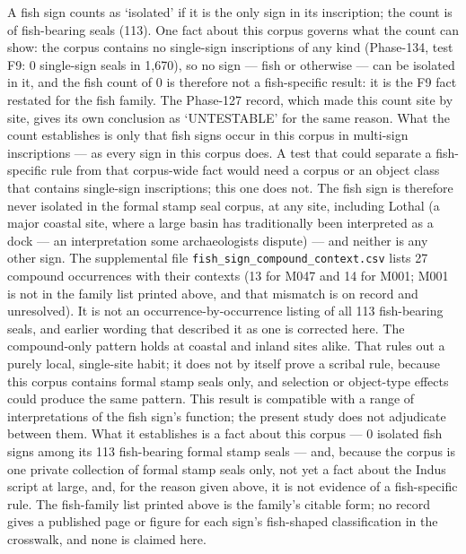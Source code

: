 \documentclass[
]{article}
\newcounter{none} %
\begin{document}
A fish sign counts as `isolated' if it is the only sign in its inscription; the count is of fish-bearing seals (113). One fact about this corpus governs what the count can show: the corpus contains no single-sign inscriptions of any kind (Phase-134, test F9: 0 single-sign seals in 1,670), so no sign --- fish or otherwise --- can be isolated in it, and the fish count of 0 is therefore not a fish-specific result: it is the F9 fact restated for the fish family. The Phase-127 record, which made this count site by site, gives its own conclusion as `UNTESTABLE' for the same reason. What the count establishes is only that fish signs occur in this corpus in multi-sign inscriptions --- as every sign in this corpus does. A test that could separate a fish-specific rule from that corpus-wide fact would need a corpus or an object class that contains single-sign inscriptions; this one does not. The fish sign is therefore never isolated in the formal stamp seal corpus, at any site, including Lothal (a major coastal site, where a large basin has traditionally been interpreted as a dock --- an interpretation some archaeologists dispute) --- and neither is any other sign. The supplemental file \texttt{fish\_sign\_compound\_context.csv} lists 27 compound occurrences with their contexts (13 for M047 and 14 for M001; M001 is not in the family list printed above, and that mismatch is on record and unresolved). It is not an occurrence-by-occurrence listing of all 113 fish-bearing seals, and earlier wording that described it as one is corrected here. The compound-only pattern holds at coastal and inland sites alike. That rules out a purely local, single-site habit; it does not by itself prove a scribal rule, because this corpus contains formal stamp seals only, and selection or object-type effects could produce the same pattern. This result is compatible with a range of interpretations of the fish sign's function; the present study does not adjudicate between them. What it establishes is a fact about this corpus --- 0 isolated fish signs among its 113 fish-bearing formal stamp seals --- and, because the corpus is one private collection of formal stamp seals only, not yet a fact about the Indus script at large, and, for the reason given above, it is not evidence of a fish-specific rule. The fish-family list printed above is the family's citable form; no record gives a published page or figure for each sign's fish-shaped classification in the crosswalk, and none is claimed here.
\end{document}
